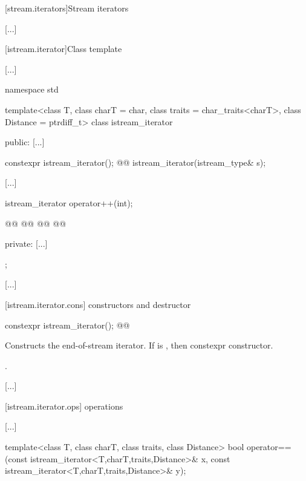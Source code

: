 [stream.iterators]{Stream iterators}

[...]

[istream.iterator]{Class template }

[...]

\begin{codeblock}
namespace std {
  template<class T, class charT = char, class traits = char_traits<charT>,
           class Distance = ptrdiff_t>
  class istream_iterator {
  public:
    [...]

    constexpr istream_iterator();
    @@
    istream_iterator(istream_type& s);

    [...]

    istream_iterator  operator++(int);

    @@
    @@
    @@
    @@

  private:
    [...]
  };

  [...]
}
\end{codeblock}

[istream.iterator.cons]{ constructors and destructor}

%
\begin{itemdecl}
constexpr istream_iterator();
@@
\end{itemdecl}

\begin{itemdescr}
\pnum
\effects
Constructs the end-of-stream iterator.
If  is ,
then  constexpr
constructor.

\pnum
\postconditions {}.
\end{itemdescr}

[...]

[istream.iterator.ops]{ operations}

[...]

\setcounter{Paras}{7}
%
\begin{itemdecl}
template<class T, class charT, class traits, class Distance>
  bool operator==(const istream_iterator<T,charT,traits,Distance>& x,
                  const istream_iterator<T,charT,traits,Distance>& y);
\end{itemdecl}

